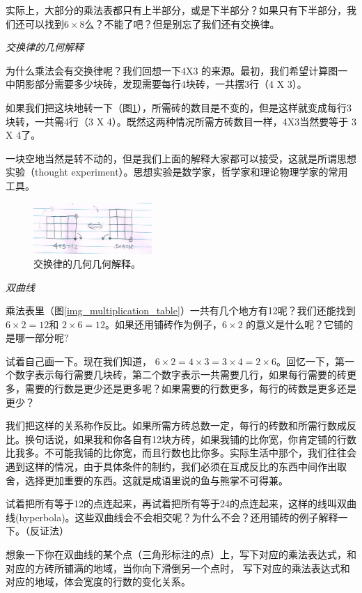 实际上，大部分的乘法表都只有上半部分，或是下半部分？如果只有下半部分，我们还可以找到$6\times8$么？不能了吧？但是别忘了我们还有交换律。

\emph{交换律的几何解释}

为什么乘法会有交换律呢？我们回想一下4X3 的来源。最初，我们希望计算图一	中阴影部分需要多少块砖，发现需要每行4块砖，一共摆3行（4 X 3）。

如果我们把这块地转一下（图\ref{img_commutative}），所需砖的数目是不变的，但是这样就变成每行3块转，一共需4行（3 X 4）。既然这两种情况所需方砖数目一样，4X3当然要等于 3 X 4了。

一块空地当然是转不动的，但是我们上面的解释大家都可以接受，这就是所谓思想实验（thought experiment）。思想实验是数学家，哲学家和理论物理学家的常用工具。

\begin{figure}[h]
    \center
     \includegraphics[width=0.4\textwidth]{multiplication_res/commutative}
     \caption{交换律的几何几何解释。}
     \label{img_commutative}
\end{figure}

\emph{双曲线}

乘法表里（图\ref{img_multiplication_table}）一共有几个地方有12呢？我们还能找到$6\times2 = 12$和 $2\times6 = 12$。如果还用铺砖作为例子，$6\times2$ 的意义是什么呢？它铺的是哪一部分呢?

试着自己画一下。现在我们知道， $6\times2 = 4\times3 = 3\times4 = 2\times 6$。回忆一下，第一个数字表示每行需要几块砖，第二个数字表示一共需要几行，如果每行需要的砖更多，需要的行数是更少还是更多呢？如果需要的行数更多，每行的砖数是更多还是更少？

我们把这样的关系称作反比。如果所需方砖总数一定，每行的砖数和所需行数成反比。换句话说，如果我和你各自有12块方砖，如果我铺的比你宽，你肯定铺的行数比我多。不可能我铺的比你宽，而且行数也比你多。实际生活中那个，我们往往会遇到这样的情况，由于具体条件的制约，我们必须在互成反比的东西中间作出取舍，选择更加重要的东西。这就是成语里说的鱼与熊掌不可得兼。
 
 试着把所有等于12的点连起来，再试着把所有等于24的点连起来，这样的线叫双曲线(hyperbola)。这些双曲线会不会相交呢？为什么不会？还用铺砖的例子解释一下。（反证法）
 
想象一下你在双曲线的某个点（三角形标注的点）上，写下对应的乘法表达式，和对应的方砖所铺满的地域，当你向下滑倒另一个点时， 写下对应的乘法表达式和对应的地域，体会宽度的行数的变化关系。

